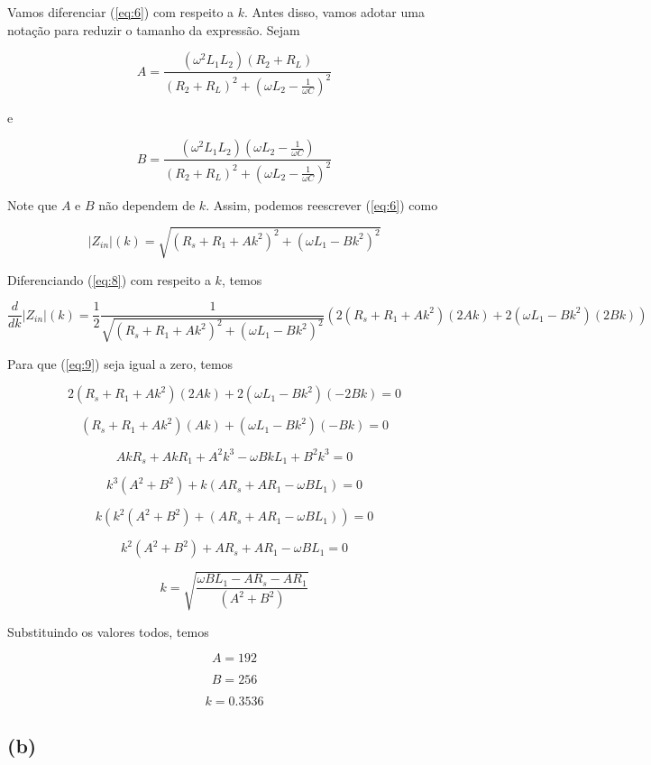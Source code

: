 \documentclass[12pt]{scrartcl}
\begin{document}
    Vamos diferenciar (\ref{eq:6}) com respeito a \(k\). Antes disso, vamos adotar uma notação para reduzir o tamanho da expressão.\newline
    Sejam

    \[ A = \frac{(\omega^2L_1L_2)(R_2 + R_L)}{(R_2 + R_L)^2 + (\omega L_2 - \frac{1}{\omega C})^2} \]

    e 

    \[ B = \frac{(\omega^2L_1L_2)(\omega L_2 - \frac{1}{\omega C})}{(R_2 + R_L)^2 + (\omega L_2 - \frac{1}{\omega C})^2} \]

    Note que  \(A\) e \(B\) não dependem de \(k\). Assim, podemos reescrever (\ref{eq:6}) como

    \begin{equation}\label{eq:8}
        |Z_{in}|(k) = \sqrt{\left(R_s + R_1 + A k^2\right)^2 + \left(\omega L_1 - B k^2\right)^2}
    \end{equation}

    Diferenciando (\ref{eq:8}) com respeito a \(k\), temos

    \begin{equation}\label{eq:9}
         \frac{d}{dk}|Z_{in}|(k) = \frac{1}{2}\frac{1}{\sqrt{\left(R_s + R_1 + A k^2\right)^2 + \left(\omega L_1 - B k^2\right)^2}} \left(2(R_s + R_1 + A k^2)(2Ak) + 2(\omega L_1 - B k^2)(2Bk)\right)
    \end{equation}

    Para que (\ref{eq:9}) seja igual a zero, temos

    \[ 2(R_s + R_1 + A k^2)(2Ak) + 2(\omega L_1 - B k^2)(-2Bk) = 0 \]

    \[ (R_s + R_1 + A k^2)(Ak) + (\omega L_1 - B k^2)(-Bk) = 0 \]

    \[ AkR_s + AkR_1 + A^2k^3 - \omega BkL_1 + B^2k^3 = 0 \]

    \[ k^3(A^2+B^2) + k(AR_s + AR_1 - \omega BL_1) = 0 \]

    \[ k\left(k^2(A^2+B^2) + (AR_s + AR_1 - \omega BL_1)\right) = 0 \]

    \[ k^2(A^2+B^2) + AR_s + AR_1 - \omega BL_1 = 0 \]

    \[ k = \sqrt{\frac{\omega BL_1 - AR_s - AR_1 }{(A^2+B^2)}} \]

    Substituindo os valores todos, temos

    \[ A = 192 \]

    \[ B = 256 \]

    \[ \boxed{k = 0.3536} \]

    \subsection*{(b)}
\end{document}
